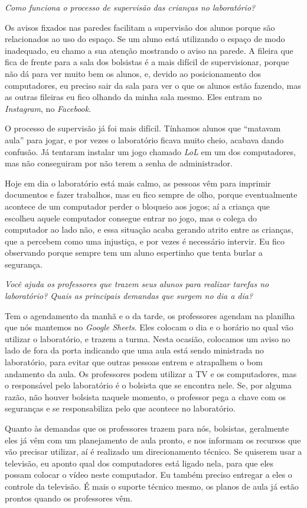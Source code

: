 \textit{Como funciona o processo de supervisão das crianças no laboratório?}

Os avisos fixados nas paredes facilitam a supervisão dos alunos porque são relacionados ao uso do espaço. Se um aluno está utilizando o espaço de modo inadequado, eu chamo a sua atenção mostrando o aviso na parede. A fileira que fica de frente para a sala dos bolsistas é a mais difícil de supervisionar, porque não dá para ver muito bem os alunos, e, devido ao posicionamento dos computadores, eu preciso sair da sala para ver o que os alunos estão fazendo, mas as outras fileiras eu fico olhando da minha sala mesmo. Eles entram no \textit{Instagram}, no \textit{Facebook}.

O processo de supervisão já foi mais difícil. Tínhamos alunos que “matavam aula” para jogar, e por vezes o laboratório ficava muito cheio, acabava dando confusão. Já tentaram instalar um jogo chamado \textit{LoL} em um dos computadores, mas não conseguiram por não terem a senha de administrador.

Hoje em dia o laboratório está mais calmo, as pessoas vêm para imprimir documentos e fazer trabalhos, mas eu fico sempre de olho, porque eventualmente acontece de um computador perder o bloqueio aos jogos; aí a criança que escolheu aquele computador consegue entrar no jogo, mas o colega do computador ao lado não, e essa situação acaba gerando atrito entre as crianças, que a percebem como uma injustiça, e por vezes é necessário intervir. Eu fico observando porque sempre tem um aluno espertinho que tenta burlar a segurança.

\textit{Você ajuda os professores que trazem seus alunos para realizar tarefas no laboratório? Quais as principais demandas que surgem no dia a dia?}

Tem o agendamento da manhã e o da tarde, os professores agendam na planilha que nós mantemos no \textit{Google Sheets}. Eles colocam o dia e o horário no qual vão utilizar o laboratório, e trazem a turma. Nesta ocasião, colocamos um aviso no lado de fora da porta indicando que uma aula está sendo ministrada no laboratório, para evitar que outras pessoas entrem e atrapalhem o bom andamento da aula. Os professores podem utilizar a TV e os computadores, mas o responsável pelo laboratório é o bolsista que se encontra nele. Se, por alguma razão, não houver bolsista naquele momento, o professor pega a chave com os seguranças e se responsabiliza pelo que acontece no laboratório.

Quanto às demandas que os professores trazem para nós, bolsistas, geralmente eles já vêm com um planejamento de aula pronto, e nos informam os recursos que vão precisar utilizar, aí é realizado um direcionamento técnico. Se quiserem usar a televisão, eu aponto qual dos computadores está ligado nela, para que eles possam colocar o vídeo neste computador. Eu também preciso entregar a eles o controle da televisão. É mais o suporte técnico mesmo, os planos de aula já estão prontos quando os professores vêm.

